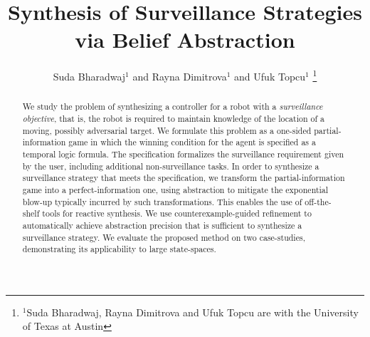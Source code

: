 \documentclass[letterpaper, 10 pt, conference]{ieeeconf}  %
\title{\LARGE \bf Synthesis of Surveillance Strategies via Belief Abstraction}
\author{Suda Bharadwaj$^{1}$ and Rayna Dimitrova$^{1}$ and Ufuk Topcu$^{1}$%
\thanks{$^{1}$Suda Bharadwaj, Rayna Dimitrova and Ufuk Topcu are with the University of Texas at Austin}%
}
\begin{document}
\maketitle
\thispagestyle{empty}
\pagestyle{empty}


\begin{abstract}
We study the problem of synthesizing a controller for a robot with a \emph{surveillance objective}, that is, the robot is required to  maintain knowledge of the location of a moving, possibly adversarial target. We formulate this problem as a one-sided partial-information  game in which the winning condition for the agent is specified as a temporal logic formula. The specification formalizes the surveillance requirement given by the user, including additional non-surveillance tasks. In order to synthesize a surveillance strategy that meets the specification, we transform the partial-information game into a perfect-information one, using abstraction to mitigate the exponential blow-up typically incurred by such transformations. This enables the use of off-the-shelf tools for reactive synthesis. We use counterexample-guided refinement to automatically achieve abstraction precision that is sufficient to synthesize a surveillance strategy. We evaluate the proposed method on two case-studies, demonstrating its applicability to large state-spaces.




\end{abstract}
\end{document}

